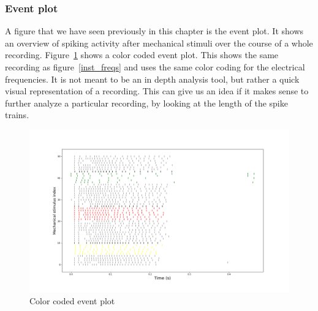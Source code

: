 \subsubsection{Event plot}
A figure that we have seen previously in this chapter is the event plot. It shows an overview of spiking activity after mechanical stimuli over the course of a whole recording. Figure~\ref{fig:event_color} shows a color coded event plot. This shows the same recording as figure~\ref{inst_freqs} and uses the same color coding for the electrical frequencies. It is not meant to be an in depth analysis tool, but rather a quick visual representation of a recording. This can give us an idea if it makes sense to further analyze a particular recording, by looking at the length of the spike trains.

\begin{figure}
	\includegraphics[width = \textwidth]{src/pic/11_12_13U1bevent_color}
	\caption{Color coded event plot}
	\label{fig:event_color}
\end{figure}







\cleardoublepage
